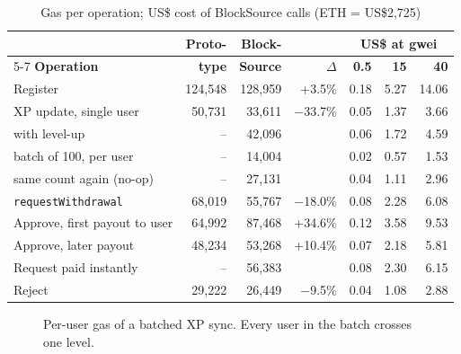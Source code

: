 \documentclass[conference]{IEEEtran}
\begin{document}
\begin{table}[t]
\centering
\caption{Gas per operation; US\$ cost of BlockSource calls (ETH = US\$2{,}725)}
\label{tab:gas}
\scriptsize
\setlength{\tabcolsep}{2.4pt}
\begin{tabular}{@{}lrrrrrr@{}}
\toprule
& \textbf{Proto-} & \textbf{Block-} & & \multicolumn{3}{c}{\textbf{US\$ at gwei}}\\
\cmidrule(l){5-7}
\textbf{Operation} & \textbf{type} & \textbf{Source} & \textbf{$\Delta$} & \textbf{0.5} & \textbf{15} & \textbf{40}\\
\midrule
Register & 124{,}548 & 128{,}959 & +3.5\% & 0.18 & 5.27 & 14.06\\
XP update, single user & 50{,}731 & 33{,}611 & $-$33.7\% & 0.05 & 1.37 & 3.66\\
\quad with level-up & -- & 42{,}096 & & 0.06 & 1.72 & 4.59\\
\quad batch of 100, per user & -- & 14{,}004 & & 0.02 & 0.57 & 1.53\\
\quad same count again (no-op) & -- & 27{,}131 & & 0.04 & 1.11 & 2.96\\
\texttt{requestWithdrawal} & 68{,}019 & 55{,}767 & $-$18.0\% & 0.08 & 2.28 & 6.08\\
Approve, first payout to user & 64{,}992 & 87{,}468 & +34.6\% & 0.12 & 3.58 & 9.53\\
Approve, later payout & 48{,}234 & 53{,}268 & +10.4\% & 0.07 & 2.18 & 5.81\\
Request paid instantly & -- & 56{,}383 & & 0.08 & 2.30 & 6.15\\
Reject & 29{,}222 & 26{,}449 & $-$9.5\% & 0.04 & 1.08 & 2.88\\
\bottomrule
\end{tabular}
\end{table}

\begin{figure}[t]
\centering
{}
\caption{Per-user gas of a batched XP sync. Every user in the batch crosses one level.}
\label{fig:batch}
\end{figure}
\end{document}
